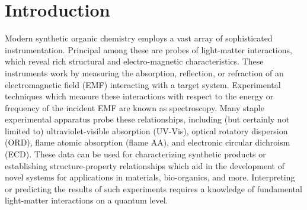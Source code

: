 \chapter{Introduction} \label{ch:int}

Modern synthetic organic chemistry employs a vast array of sophisticated
instrumentation.  Principal among these are probes of light-matter
interactions, which reveal rich structural and electro-magnetic
characteristics. These instruments work by measuring the absorption,
reflection, or refraction of an electromagnetic field (EMF) interacting
with a target system.\cite{Barron2004} Experimental techniques which
measure these interactions with respect to the energy or frequency of
the incident EMF are known as spectroscopy. Many staple experimental
apparatus probe these relationships, including (but certainly not limited
to) ultraviolet-visible absorption (UV-Vis), optical rotatory dispersion
(ORD), flame atomic absorption (flame AA), and electronic circular dichroism
(ECD). These data can be used for characterizing synthetic products or
establishing structure-property relationships which aid in the development
of novel systems for applications in materials, bio-organics, and more.
Interpreting or predicting the results of such experiments requires a
knowledge of fundamental light-matter interactions on a quantum level.

